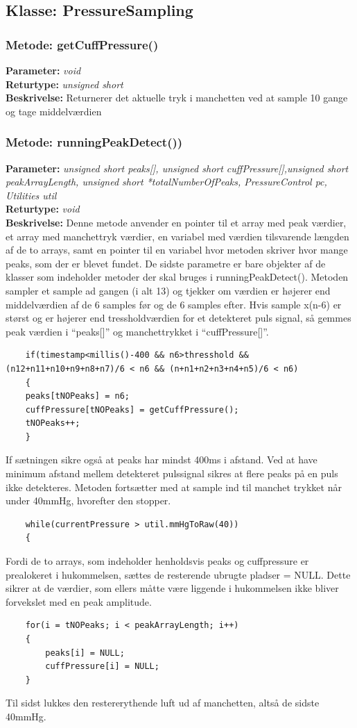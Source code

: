 \subsection{Klasse: PressureSampling}

\subsubsection{Metode: getCuffPressure()}
\textbf{Parameter: } \textit{void}
\\ \textbf{Returtype: } \textit{unsigned short }
\\ \textbf{Beskrivelse: } Returnerer det aktuelle tryk i manchetten ved at sample 10 gange og tage middelværdien

\subsubsection{Metode: runningPeakDetect())}
\textbf{Parameter: } \textit{unsigned short peaks[], unsigned short cuffPressure[],unsigned short peakArrayLength, unsigned short *totalNumberOfPeaks, PressureControl pc, Utilities util}
\\ \textbf{Returtype: } \textit{void}
\\ \textbf{Beskrivelse: } Denne metode anvender en pointer til et array med peak værdier, et array med manchettryk værdier, en variabel med værdien tilsvarende længden af de to arrays, samt en pointer til en variabel hvor metoden skriver hvor mange peaks, som der er blevet fundet. De sidste parametre er bare objekter af de klasser som indeholder metoder der skal bruges i runningPeakDetect().
Metoden sampler et sample ad gangen (i alt 13) og tjekker om værdien er højerer end middelværdien af de 6 samples før og de 6 samples efter. Hvis sample x(n-6) er størst og er højerer end tressholdværdien for et detekteret puls signal, så gemmes peak værdien i “peaks[]” og manchettrykket i “cuffPressure[]”.
\begin{lstlisting}
	if(timestamp<millis()-400 && n6>thresshold && (n12+n11+n10+n9+n8+n7)/6 < n6 && (n+n1+n2+n3+n4+n5)/6 < n6)
	{
	peaks[tNOPeaks] = n6;
	cuffPressure[tNOPeaks] = getCuffPressure();
	tNOPeaks++;
	}
\end{lstlisting}
If sætningen sikre også at peaks har mindst 400ms i afstand. Ved at have minimum afstand mellem detekteret pulssignal sikres at flere peaks på en puls ikke detekteres. Metoden fortsætter med at sample ind til manchet trykket når under 40mmHg, hvorefter den stopper. 
\begin{lstlisting}
	while(currentPressure > util.mmHgToRaw(40))
	{
\end{lstlisting}
Fordi de to arrays, som indeholder henholdsvis peaks og cuffpressure er prealokeret i hukommelsen, sættes de resterende ubrugte pladser = NULL. Dette sikrer at de værdier, som ellers måtte være liggende i hukommelsen ikke bliver forvekslet med en peak amplitude. 
\begin{lstlisting}
	for(i = tNOPeaks; i < peakArrayLength; i++)
	{
		peaks[i] = NULL;
		cuffPressure[i] = NULL;
	}
\end{lstlisting}
Til sidst lukkes den restererythende luft ud af manchetten, altså de sidste 40mmHg.

